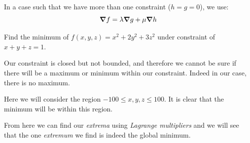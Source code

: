\documentclass[00_complete]{subfiles}
\begin{document}
In a case such that we have more than one constraint ($h=g=0$), we use:
$$\grad f = \lambda \grad g + \mu \grad h$$
\begin{example}
    Find the minimum of $f(x,y,z)=x^2+2y^2+3z^2$ under constraint of $x+y+z=1$.

    Our constraint is closed but not bounded, and therefore we cannot be sure
    if there will be a maximum or minimum within our constraint. Indeed in our
    case, there is no maximum.

    Here we will consider the region $-100 \leq x,y,z \leq 100$. It is clear
    that the minimum will be within this region.

    From here we can find our \emph{extrema} using \emph{Lagrange multipliers}
    and we will see that the one \emph{extremum} we find is indeed the global
    minimum.
\end{example}
\end{document}
